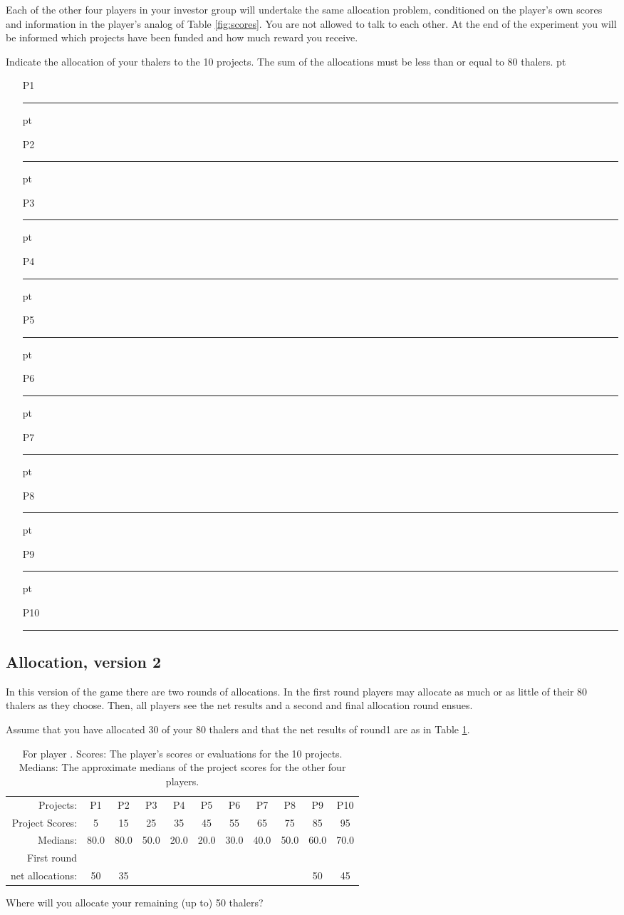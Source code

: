 \documentclass[11pt, oneside]{article}   	%
\begin{document}
Each of the other four players in your investor group will undertake the same allocation problem, conditioned on the player's own scores and information in the player's analog of Table \ref{fig:scores}. You are not allowed to talk to each other. At the end of the experiment you will be informed which projects have been funded and how much reward you receive.

Indicate the allocation of your thalers to the 10 projects. The sum of the allocations must be less than or equal to 80 thalers.
 pt
\begin{enumerate}
\setlength\itemsep{20pt}
\item[P1] \rule{6cm}{2pt}
 pt
\item[P2] \rule{6cm}{2pt}
 pt
\item[P3] \rule{6cm}{2pt}
 pt
\item[P4] \rule{6cm}{2pt}
 pt
\item[P5] \rule{6cm}{2pt}
 pt
\item[P6] \rule{6cm}{2pt}
 pt
\item[P7] \rule{6cm}{2pt}
 pt
\item[P8] \rule{6cm}{2pt}
 pt
\item[P9] \rule{6cm}{2pt}
 pt
\item[P10] \rule{6cm}{2pt}
\end{enumerate}


\subsection{Allocation, version 2}

In this version of the game there are two rounds of allocations. In the first round players may allocate as much or as little of their 80 thalers as they choose. Then, all players see the net results and a second and final allocation round ensues.

Assume that you have allocated 30 of your 80 thalers and that the net results of round1 are as in Table \ref{fig:scores2}.

\begin{table}[h]
\centering
\begin{tabular}{r|cccccccccc}
Projects: & P1 & P2 & P3 & P4 & P5 & P6 & P7 & P8 & P9 & P10 \\
Project Scores: & 5 & 15 & 25 & 35 & 45 & 55 & 65 & 75 & 85 & 95 \\
Medians: &80.0 & 80.0 & 50.0 & 20.0 & 20.0 & 30.0 & 40.0 & 50.0 & 60.0 & 70.0 \\
First round  & & & & & & & & & & \\
net allocations:  & 50 & 35 & & & & & & & 50 & 45 \\
\end{tabular}
\caption{For player \theplayer . Scores: The player's scores or evaluations for the 10 projects. Medians: The approximate medians of the project scores for the other four players.}
\label{fig:scores2}
\end{table}
Where will you allocate your remaining (up to) 50 thalers?
\end{document}
